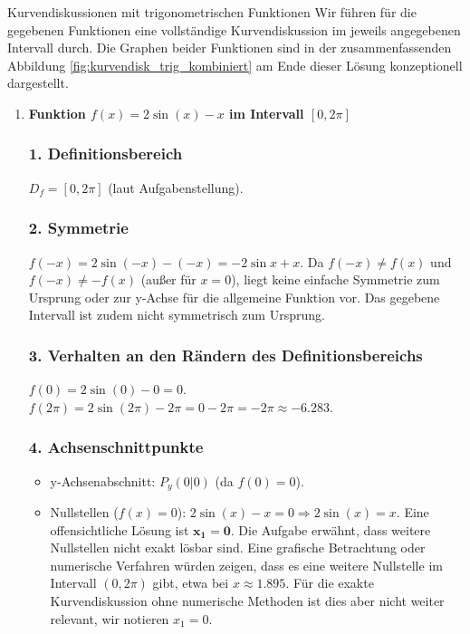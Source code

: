 \begin{loesungsumgebung}{Kurvendiskussionen mit trigonometrischen Funktionen}
Wir führen für die gegebenen Funktionen eine vollständige Kurvendiskussion im jeweils angegebenen Intervall durch. Die Graphen beider Funktionen sind in der zusammenfassenden Abbildung \ref{fig:kurvendisk_trig_kombiniert} am Ende dieser Lösung konzeptionell dargestellt.

\begin{enumerate}[label=(\alph*)]
    \item \textbf{Funktion $f(x) = 2\sin(x) - x$ im Intervall $[0, 2\pi]$}

    \subsubsection*{1. Definitionsbereich}
    $D_f = [0, 2\pi]$ (laut Aufgabenstellung).

    \subsubsection*{2. Symmetrie}
    $f(-x) = 2\sin(-x) - (-x) = -2\sin x + x$. Da $f(-x) \neq f(x)$ und $f(-x) \neq -f(x)$ (außer für $x=0$), liegt keine einfache Symmetrie zum Ursprung oder zur y-Achse für die allgemeine Funktion vor. Das gegebene Intervall ist zudem nicht symmetrisch zum Ursprung.

    \subsubsection*{3. Verhalten an den Rändern des Definitionsbereichs}
    $f(0) = 2\sin(0) - 0 = 0$.
    $f(2\pi) = 2\sin(2\pi) - 2\pi = 0 - 2\pi = -2\pi \approx -6.283$.

    \subsubsection*{4. Achsenschnittpunkte}
    \begin{itemize}
        \item y-Achsenabschnitt: $P_y(0|0)$ (da $f(0)=0$).
        \item Nullstellen ($f(x)=0$): $2\sin(x) - x = 0 \Rightarrow 2\sin(x) = x$.
        Eine offensichtliche Lösung ist $\mathbf{x_1=0}$.
        Die Aufgabe erwähnt, dass weitere Nullstellen nicht exakt lösbar sind. Eine grafische Betrachtung oder numerische Verfahren würden zeigen, dass es eine weitere Nullstelle im Intervall $(0, 2\pi)$ gibt, etwa bei $x \approx 1.895$. Für die exakte Kurvendiskussion ohne numerische Methoden ist dies aber nicht weiter relevant, wir notieren $x_1=0$.
    \end{itemize}


\end{enumerate}
\end{loesungsumgebung}
